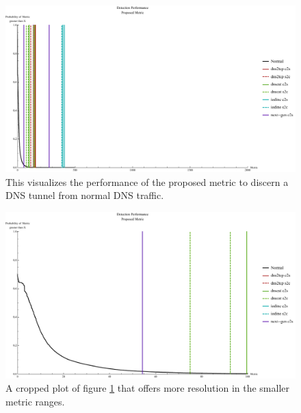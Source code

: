 \documentclass[12pt]{report}
\theoremstyle{remark}
\theoremstyle{definition}
\theoremstyle{definition}
\theoremstyle{definition}
\begin{document}
\begin{figure}
\centering
\includegraphics[width=\textwidth]{figures/mphv.pdf}
\caption[Detection Thresholds Under the Proposed Metric]{This visualizes the performance of the proposed metric to discern a DNS tunnel from normal DNS traffic.}
\label{mphv}
\end{figure}
\begin{figure}
\centering
\includegraphics[width=\textwidth]{figures/mphv-100.pdf}
\caption[Detection Thresholds Under the Proposed Metric - Truncated View]{A cropped plot of figure \ref{mphv} that offers more resolution in the smaller metric ranges.}
\label{mphv-100}
\end{figure}
\end{document}
